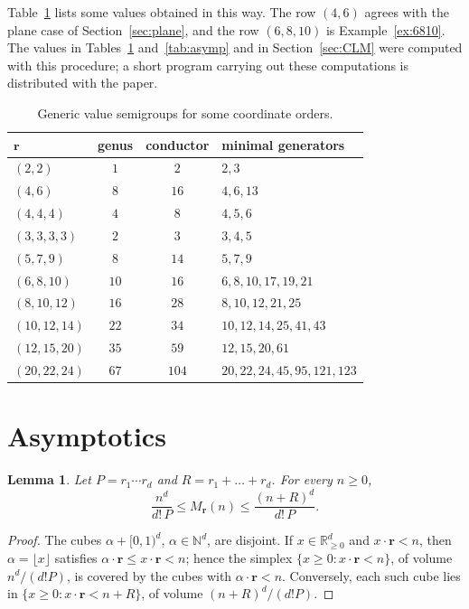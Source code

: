 \documentclass{amsart}
\newtheorem{lemma}[theorem]{Lemma}
\theoremstyle{definition}
\numberwithin{equation}{section}
\newcommand{\N}{\mathbb{N}}
\newcommand{\R}{\mathbb{R}}
\newcommand{\bfr}{\mathbf{r}}
\begin{document}
Table~\ref{tab:examples} lists some values obtained in this way. The row
$(4,6)$ agrees with the plane case of Section~\ref{sec:plane}, and the row
$(6,8,10)$ is Example~\ref{ex:6810}. The values in Tables~\ref{tab:examples}
and~\ref{tab:asymp} and in Section~\ref{sec:CLM} were computed with this
procedure; a short program carrying out these computations is distributed with
the paper.

\begin{table}[ht]
\caption{Generic value semigroups for some coordinate orders.}
\label{tab:examples}
\centering
\begin{tabular}{@{}lccl@{}}
\toprule
$\bfr$ & genus & conductor & minimal generators\\
\midrule
$(2,2)$ & $1$ & $2$ & $2,3$\\
$(4,6)$ & $8$ & $16$ & $4,6,13$\\
$(4,4,4)$ & $4$ & $8$ & $4,5,6$\\
$(3,3,3,3)$ & $2$ & $3$ & $3,4,5$\\
$(5,7,9)$ & $8$ & $14$ & $5,7,9$\\
$(6,8,10)$ & $10$ & $16$ & $6,8,10,17,19,21$\\
$(8,10,12)$ & $16$ & $28$ & $8,10,12,21,25$\\
$(10,12,14)$ & $22$ & $34$ & $10,12,14,25,41,43$\\
$(12,15,20)$ & $35$ & $59$ & $12,15,20,61$\\
$(20,22,24)$ & $67$ & $104$ & $20,22,24,45,95,121,123$\\
\bottomrule
\end{tabular}
\end{table}

\section{Asymptotics}\label{sec:asymp}

\begin{lemma}\label{lem:volume}
Let $P=r_1\cdots r_d$ and $R=r_1+\dots+r_d$. For every $n\ge0$,
\[
  \frac{n^d}{d!\,P}\le M_{\bfr}(n)\le\frac{(n+R)^d}{d!\,P}.
\]
\end{lemma}

\begin{proof}
The cubes $\alpha+[0,1)^d$, $\alpha\in\N^d$, are disjoint. If $x\in\R_{\ge0}^d$
and $x\cdot\bfr<n$, then $\alpha=\lfloor x\rfloor$ satisfies
$\alpha\cdot\bfr\le x\cdot\bfr<n$; hence the simplex
$\{x\ge0:x\cdot\bfr<n\}$, of volume $n^d/(d!P)$, is covered by the cubes with
$\alpha\cdot\bfr<n$. Conversely, each such cube lies in
$\{x\ge0:x\cdot\bfr<n+R\}$, of volume $(n+R)^d/(d!P)$.
\end{proof}
\end{document}
